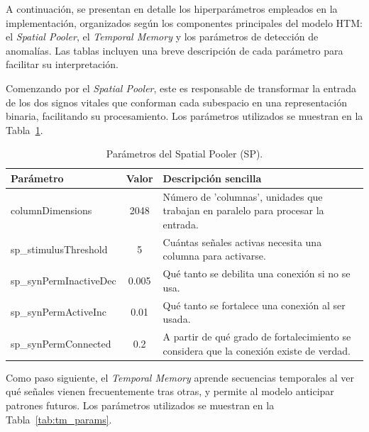 A continuación, se presentan en detalle los hiperparámetros empleados en la implementación, organizados según los componentes principales del modelo HTM: el \textit{Spatial Pooler}, el \textit{Temporal Memory} y los parámetros de detección de anomalías. Las tablas incluyen una breve descripción de cada parámetro para facilitar su interpretación.

\medskip

Comenzando por el \textit{Spatial Pooler}, este es responsable de transformar la entrada de los dos signos vitales que conforman cada subespacio en una representación binaria, facilitando su procesamiento. Los parámetros utilizados se muestran en la Tabla~\ref{tab:spatial_pooler_params}.

\begin{table}[H]
  \centering
  \small
  \begin{tabular}{l c p{7cm}}
    \hline
    \textbf{Parámetro} & \textbf{Valor} & \textbf{Descripción sencilla} \\
    \hline
    columnDimensions & 2048 & Número de 'columnas', unidades que trabajan en paralelo para procesar la entrada. \\
    sp\_stimulusThreshold & 5 & Cuántas señales activas necesita una columna para activarse. \\
    sp\_synPermInactiveDec & 0.005 & Qué tanto se debilita una conexión si no se usa. \\
    sp\_synPermActiveInc & 0.01 & Qué tanto se fortalece una conexión al ser usada. \\
    sp\_synPermConnected & 0.2 & A partir de qué grado de fortalecimiento se considera que la conexión existe de verdad. \\
    \hline
  \end{tabular}
  \caption{Parámetros del Spatial Pooler (SP).}
  \label{tab:spatial_pooler_params}
\end{table}

\medskip

Como paso siguiente, el \textit{Temporal Memory} aprende secuencias temporales al ver qué señales vienen frecuentemente tras otras, y permite al modelo anticipar patrones futuros. Los parámetros utilizados se muestran en la Tabla~\ref{tab:tm_params}.

